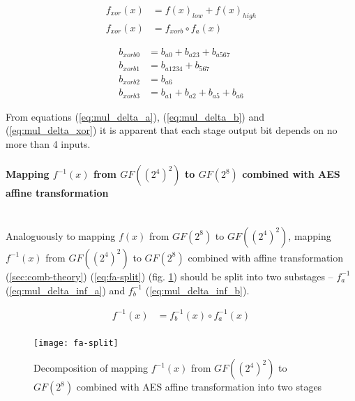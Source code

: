 \begin{equation}
\begin{aligned}
f_{xor}(x) &= f(x)_{low} + f(x)_{high} \\
f_{xor}(x) &= f_{xorb} \circ f_a(x)
\end{aligned}
\end{equation}

\begin{equation}
\label{eq:mul_delta_xor}
\begin{aligned}
b_{xorb0} &= b_{a0} + b_{a23} + b_{a567}       \\
b_{xorb1} &= b_{a1234} + b_{567}               \\
b_{xorb2} &= b_{a6}                            \\
b_{xorb3} &= b_{a1} + b_{a2} + b_{a5} + b_{a6}
\end{aligned}
\end{equation}

From equations (\ref{eq:mul_delta_a}), (\ref{eq:mul_delta_b}) and (\ref{eq:mul_delta_xor}) it is apparent that each stage output bit depends on no more than 4 inputs.




\paragraph{Mapping $f^{-1}(x)$ from $GF((2^4)^2)$ to $GF(2^8)$ combined with AES affine transformation}\mbox{}\\
Analoguously to mapping $f(x)$ from $GF(2^8)$ to $GF((2^4)^2)$, mapping $f^{-1}(x)$ from $GF((2^4)^2)$ to $GF(2^8)$ combined with affine transformation (\ref{sec:comb-theory}) (\ref{eq:fa-split}) (fig. \ref{fig:fa-split}) should be split into two substages --  $f^{-1}_a$ (\ref{eq:mul_delta_inf_a}) and $f^{-1}_b$ (\ref{eq:mul_delta_inf_b}).

\begin{equation}
\label{eq:fa-split}
\begin{aligned}
f^{-1}(x) &= f_b^{-1}(x) \circ f_a^{-1}(x) \\
\end{aligned}
\end{equation}

\begin{figure}[!h]
\centering
\texttt{[image: fa-split]}
\caption{Decomposition of mapping $f^{-1}(x)$ from $GF((2^4)^2)$ to $GF(2^8)$ combined with AES affine transformation into two stages}
\label{fig:fa-split}
\end{figure}



